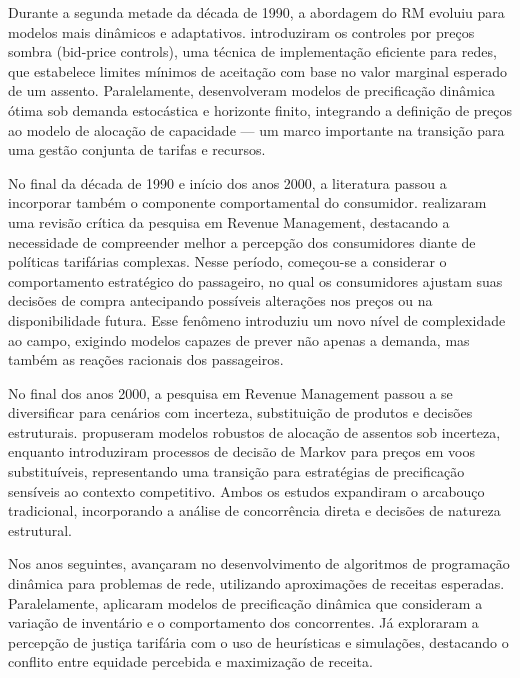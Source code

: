 Durante a segunda metade da década de 1990, a abordagem do RM evoluiu para modelos mais dinâmicos e adaptativos. \citep{Talluri_Ryzin1998} introduziram os controles por preços sombra (bid-price controls), uma técnica de implementação eficiente para redes, que estabelece limites mínimos de aceitação com base no valor marginal esperado de um assento. Paralelamente, \citep{Gallego1994} desenvolveram modelos de precificação dinâmica ótima sob demanda estocástica e horizonte finito, integrando a definição de preços ao modelo de alocação de capacidade — um marco importante na transição para uma gestão conjunta de tarifas e recursos.

No final da década de 1990 e início dos anos 2000, a literatura passou a incorporar também o componente comportamental do consumidor. \citep{McGill_Ryzin1999} realizaram uma revisão crítica da pesquisa em Revenue Management, destacando a necessidade de compreender melhor a percepção dos consumidores diante de políticas tarifárias complexas. Nesse período, começou-se a considerar o comportamento estratégico do passageiro, no qual os consumidores ajustam suas decisões de compra antecipando possíveis alterações nos preços ou na disponibilidade futura. Esse fenômeno introduziu um novo nível de complexidade ao campo, exigindo modelos capazes de prever não apenas a demanda, mas também as reações racionais dos passageiros.

No final dos anos 2000, a pesquisa em Revenue Management passou a se diversificar para cenários com incerteza, substituição de produtos e decisões estruturais. \citep{Birbil2009} propuseram modelos robustos de alocação de assentos sob incerteza, enquanto \citep{ZHANG2009848} introduziram processos de decisão de Markov para preços em voos substituíveis, representando uma transição para estratégias de precificação sensíveis ao contexto competitivo. Ambos os estudos expandiram o arcabouço tradicional, incorporando a análise de concorrência direta e decisões de natureza estrutural.

Nos anos seguintes, \citep{HUANG2011333} avançaram no desenvolvimento de algoritmos de programação dinâmica para problemas de rede, utilizando aproximações de receitas esperadas. Paralelamente, \citep{Rusdiansyah_Dwi} aplicaram modelos de precificação dinâmica que consideram a variação de inventário e o comportamento dos concorrentes. Já \citep{ASLANI201456} exploraram a percepção de justiça tarifária com o uso de heurísticas e simulações, destacando o conflito entre equidade percebida e maximização de receita.

